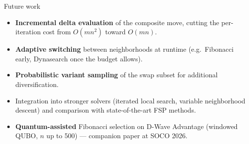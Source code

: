 \documentclass[final]{beamer}
\begin{document}
\begin{frame}
{\begin{columns}
\vspace*{6mm}

\begin{block}{Future work}
\vspace*{2mm}
\begin{itemize}
  \item \textbf{Incremental delta evaluation} of the composite move,
    cutting the per-iteration cost from $O(mn^2)$ toward $O(mn)$.
  \item \textbf{Adaptive switching} between neighborhoods at runtime
    (e.g.\ Fibonacci early, Dynasearch once the budget allows).
  \item \textbf{Probabilistic variant sampling} of the swap subset for
    additional diversification.
  \item Integration into stronger solvers (iterated local search,
    variable neighborhood descent) and comparison with
    state-of-the-art FSP methods.
  \item \textbf{Quantum-assisted} Fibonacci selection on D-Wave Advantage
    (windowed QUBO, $n$ up to 500) --- companion paper at SOCO 2026.
\end{itemize}
\vspace*{2mm}
\end{block}

\end{columns}
}
\end{frame}
\end{document}
